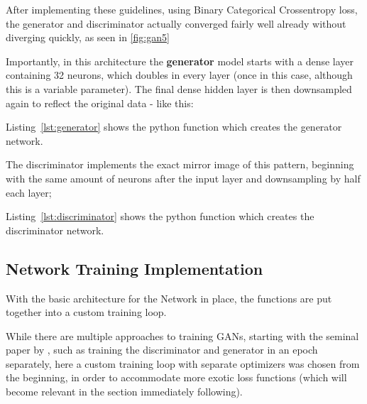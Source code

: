 \clearpage

After implementing these guidelines, using Binary Categorical Crossentropy loss, the generator and discriminator actually converged fairly well already without diverging quickly, as seen in \ref{fig:gan5}


Importantly, in this architecture the \textbf{generator} model starts with a dense layer containing 32 neurons, which doubles in every layer (once in this case, although this is a variable parameter). The final dense hidden layer is then downsampled again to reflect the original data - like this:


Listing~\ref{lst:generator} shows the python function which creates the generator network.

\pagebreak 

The discriminator implements the exact mirror image of this pattern, beginning with the same amount of neurons after the input layer and downsampling by half each layer; 


Listing~\ref{lst:discriminator} shows the python function which creates the discriminator network.

\pagebreak 

\subsection{Network Training Implementation}
\label{subsection:training_loop}

With the basic architecture for the Network in place, the functions are put together into a custom training loop. 

While there are multiple approaches to training \acp{GAN}, starting with the seminal paper by \cite{goodfellow2014generative}, such as training the discriminator and generator in an epoch separately, here a custom training loop with separate optimizers was chosen from the beginning, in order to accommodate more exotic loss functions (which will become relevant in the section immediately following).

